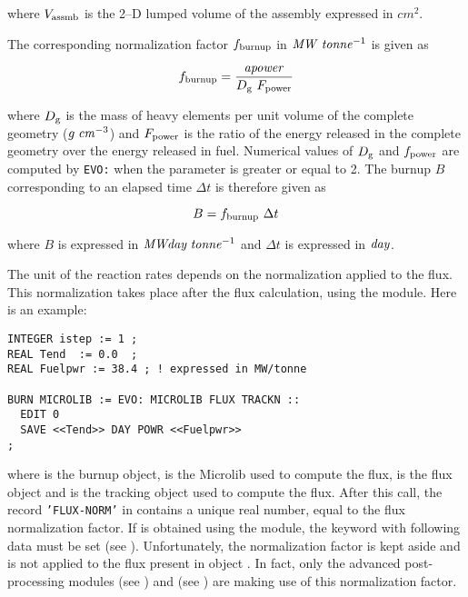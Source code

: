 \noindent where $V_{\rm assmb}$ is the 2--D lumped volume of the assembly expressed in $cm^2$.

\vskip 0.2cm

The corresponding normalization factor $f_{\rm burnup}$ in
${\it MW}\;{\it tonne}^{-1}$ is given as

\begin{equation}
f_{\rm burnup}={ {\it apower} \over D_{\rm g} \ F_{\rm power}}
\label{eq:eq2}
\end{equation}

\noindent where $D_{\rm g}$ is the mass of heavy elements per unit volume
of the complete geometry ($g\; {\it cm}^{-3}$) and $F_{\rm power}$ is the
ratio of the energy released in the complete geometry over the energy
released in fuel. Numerical values of $D_{\rm g}$ and $f_{\rm power}$ are
computed by {\tt EVO:} when the parameter  is greater or
equal to 2. The burnup $B$ corresponding to an elapsed time $\Delta t$ is
therefore given as

\begin{equation}
B=f_{\rm burnup} \ \Delta t
\label{eq:eq3}
\end{equation}

\noindent where $B$ is expressed in ${\it MWday}\;{\it tonne}^{-1}$ and $\Delta t$
is expressed in ${\it day}$.

\vskip 0.2cm

The unit of the reaction rates depends on the normalization applied to the flux. This normalization
takes place after the flux calculation, using the  module. Here is an example:

\begin{verbatim}
INTEGER istep := 1 ;
REAL Tend  := 0.0  ;
REAL Fuelpwr := 38.4 ; ! expressed in MW/tonne

BURN MICROLIB := EVO: MICROLIB FLUX TRACKN ::
  EDIT 0
  SAVE <<Tend>> DAY POWR <<Fuelpwr>>
;
\end{verbatim}

\noindent where  is the burnup object,  is the Microlib used to compute the flux,  is the flux
object and  is the tracking object used to compute the flux. After this call, the record
{\tt 'FLUX-NORM'} in  contains a unique real number, equal to the flux normalization factor. If  is
obtained using the  module, the  keyword with following data must be set (see ).
Unfortunately, the normalization factor is kept aside and is not applied to the flux present in object . In
fact, only the advanced post-processing modules  (see ) and  (see )
are making use of this normalization factor.

\eject
